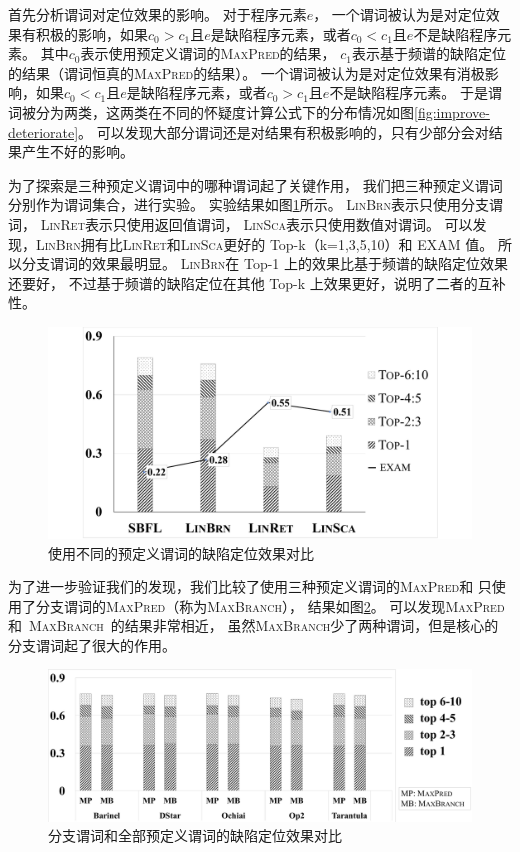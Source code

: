 首先分析谓词对定位效果的影响。
对于程序元素$e$，
一个谓词被认为是对定位效果有积极的影响，如果$c_0 > c_1$且$e$是缺陷程序元素，或者$c_0 < c_1$且$e$不是缺陷程序元素。
其中$c_0$表示使用预定义谓词的\textsc{MaxPred}的结果，
$c_1$表示基于频谱的缺陷定位的结果（谓词恒真的\textsc{MaxPred}的结果）。
一个谓词被认为是对定位效果有消极影响，如果$c_0 < c_1$且$e$是缺陷程序元素，或者$c_0 > c_1$且$e$不是缺陷程序元素。
于是谓词被分为两类，这两类在不同的怀疑度计算公式下的分布情况如图\ref{fig:improve-deteriorate}。
可以发现大部分谓词还是对结果有积极影响的，只有少部分会对结果产生不好的影响。

为了探索是三种预定义谓词中的哪种谓词起了关键作用，
我们把三种预定义谓词分别作为谓词集合，进行实验。
实验结果如图\ref{fig:diff-predictor-compare}所示。
\textsc{LinBrn}表示只使用分支谓词，
\textsc{LinRet}表示只使用返回值谓词，
\textsc{LinSca}表示只使用数值对谓词。
可以发现，\textsc{LinBrn}拥有比\textsc{LinRet}和\textsc{LinSca}更好的 Top-k（k=1,3,5,10）和 EXAM 值。
所以分支谓词的效果最明显。
\textsc{LinBrn}在 Top-1 上的效果比基于频谱的缺陷定位效果还要好，
不过基于频谱的缺陷定位在其他 Top-k 上效果更好，说明了二者的互补性。


\begin{figure}[htbp] 
\centering 
\includegraphics[width=12cm]{figure/diff-predictor-compare} 
\caption{使用不同的预定义谓词的缺陷定位效果对比} 
\label{fig:diff-predictor-compare}
\end{figure}

为了进一步验证我们的发现，我们比较了使用三种预定义谓词的\textsc{MaxPred}和
只使用了分支谓词的\textsc{MaxPred}（称为\textsc{MaxBranch}），
结果如图\ref{fig:branch-compare}。
可以发现\textsc{MaxPred}和~\textsc{MaxBranch}~的结果非常相近，
虽然\textsc{MaxBranch}少了两种谓词，但是核心的分支谓词起了很大的作用。

\begin{figure}[htbp] 
\centering 
\includegraphics[width=16cm]{figure/branch-compare} 
\caption{分支谓词和全部预定义谓词的缺陷定位效果对比} 
\label{fig:branch-compare}
\end{figure}

